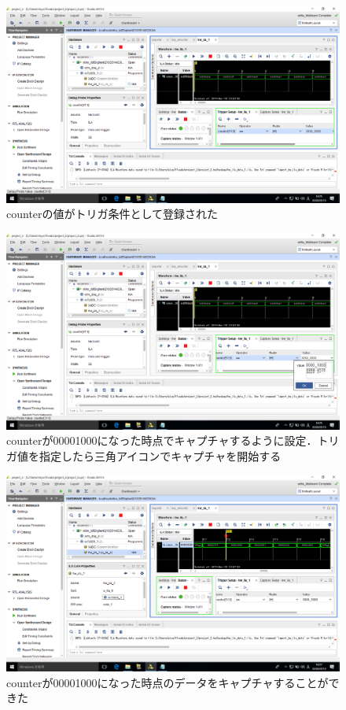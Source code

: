 \documentclass[a4paper,dvipdfmx]{jsarticle}
\begin{document}
 \begin{figure}[H]
  \begin{center}
   \includegraphics[width=.8\textwidth]{chapter05_figures/VirtualBox_Windows10_19_03_2018_14_25_34.png}
  \end{center}
  \caption{counterの値がトリガ条件として登録された}
 \end{figure}

 \begin{figure}[H]
  \begin{center}
   \includegraphics[width=.8\textwidth]{chapter05_figures/VirtualBox_Windows10_19_03_2018_14_25_50.png}
  \end{center}
  \caption{counterが00001000になった時点でキャプチャするように設定．トリガ値を指定したら三角アイコンでキャプチャを開始する}
 \end{figure}

 \begin{figure}[H]
  \begin{center}
   \includegraphics[width=.8\textwidth]{chapter05_figures/VirtualBox_Windows10_19_03_2018_14_27_49.png}
  \end{center}
  \caption{counterが00001000になった時点のデータをキャプチャすることができた}
 \end{figure}
\end{document}
